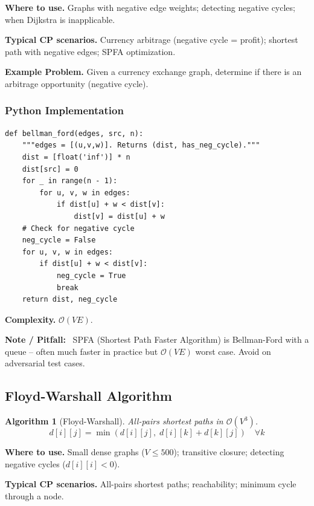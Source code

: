 \documentclass[10pt,a4paper]{article}
\theoremstyle{cpstyle}
\newtheorem{algorithm}[theorem]{Algorithm}
\newenvironment{cpnote}{%
  \begin{mdframed}[backgroundcolor=notebg, linecolor=orange!70, linewidth=1pt,
    innerleftmargin=10pt, innerrightmargin=10pt, innertopmargin=6pt, innerbottommargin=6pt]
  \textbf{\color{orange!80!black}Note / Pitfall:}~}{%
  \end{mdframed}}
\newcommand{\bigO}[1]{\mathcal{O}\!\left(#1\right)}
\begin{document}
\textbf{Where to use.} Graphs with negative edge weights; detecting negative cycles; when Dijkstra is inapplicable.

\textbf{Typical CP scenarios.} Currency arbitrage (negative cycle = profit); shortest path with negative edges; SPFA optimization.

\textbf{Example Problem.} Given a currency exchange graph, determine if there is an arbitrage opportunity (negative cycle).

\subsubsection{Python Implementation}
\begin{lstlisting}[caption={Bellman-Ford with negative cycle detection}]
def bellman_ford(edges, src, n):
    """edges = [(u,v,w)]. Returns (dist, has_neg_cycle)."""
    dist = [float('inf')] * n
    dist[src] = 0
    for _ in range(n - 1):
        for u, v, w in edges:
            if dist[u] + w < dist[v]:
                dist[v] = dist[u] + w
    # Check for negative cycle
    neg_cycle = False
    for u, v, w in edges:
        if dist[u] + w < dist[v]:
            neg_cycle = True
            break
    return dist, neg_cycle
\end{lstlisting}

\textbf{Complexity.} $\bigO{VE}$.

\begin{cpnote}
SPFA (Shortest Path Faster Algorithm) is Bellman-Ford with a queue -- often much faster in practice but $\bigO{VE}$ worst case. Avoid on adversarial test cases.
\end{cpnote}

\subsection{Floyd-Warshall Algorithm}

\begin{algorithm}[Floyd-Warshall]
All-pairs shortest paths in $\bigO{V^3}$.
\[
  d[i][j] = \min(d[i][j],\; d[i][k] + d[k][j]) \quad \forall k
\]
\end{algorithm}

\textbf{Where to use.} Small dense graphs ($V \leq 500$); transitive closure; detecting negative cycles ($d[i][i] < 0$).

\textbf{Typical CP scenarios.} All-pairs shortest paths; reachability; minimum cycle through a node.
\end{document}
